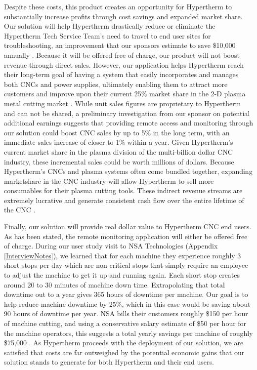 \documentclass[12pt,letterpaper,titlepage]{article}
\begin{document}
Despite these costs, this product creates an opportunity for Hypertherm to substantially increase profits through cost savings and expanded market share. Our solution will help Hypertherm drastically reduce or eliminate the Hypertherm Tech Service Team's need to travel to end user sites for troubleshooting, an improvement that our sponsors estimate to save \$10,000 annually \cite{econemail}. Because it will be offered free of charge, our product will not boost revenue through direct sales. However, our application helps Hypertherm reach their long-term goal of having a system that easily incorporates and manages both CNCs and power supplies, ultimately enabling them to attract more customers and improve upon their current 25\% market share in the 2-D plasma metal cutting market \cite{econemail}. While unit sales figures are proprietary to Hypertherm and can not be shared, a preliminary investigation from our sponsor on potential additional earnings suggests that providing remote access and monitoring through our solution could boost CNC sales by up to 5\% in the long term, with an immediate sales increase of closer to 1\% within a year. Given Hypertherm's current market share in the plasma division of the multi-billion dollar CNC industry, these incremental sales could be worth millions of dollars. Because Hypertherm's CNCs and plasma systems often come bundled together, expanding marketshare in the CNC industry will allow Hypertherm to sell more consumables for their plasma cutting tools. These indirect revenue streams are extremely lucrative and generate consistent cash flow over the entire lifetime of the CNC \cite{econemail}.
 
Finally, our solution will provide real dollar value to Hypertherm CNC end users. As has been stated, the remote monitoring application will either be offered free of charge. During our user study visit to NSA Technologies (Appendix \ref{InterviewNotes}), we learned that for each machine they experience roughly 3 short stops per day which are non-critical stops that simply require an employee to adjust the machine to get it up and running again. Each short stop creates around 20 to 30 minutes of machine down time. Extrapolating that total downtime out to a year gives 365 hours of downtime per machine. Our goal is to help reduce machine downtime by 25\%, which in this case would be saving about 90 hours of downtime per year. NSA bills their customers roughly \$150 per hour of machine cutting, and using a conservative salary estimate of \$50 per hour for the machine operators, this suggests a total yearly savings per machine of roughly \$75,000 \cite{interview2}.
As Hypertherm proceeds with the deployment of our solution, we are satisfied that costs are far outweighed by the potential economic gains that our solution stands to generate for both Hypertherm and their end users. 
\end{document}

